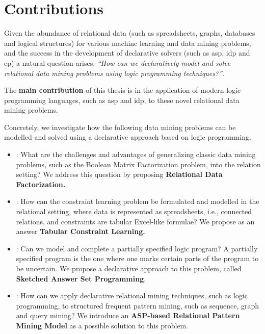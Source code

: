\section{Contributions}
Given the abundance of relational data (such as spreadsheets, graphs,
databases and logical structures) for various machine learning and data
mining problems, and the success in the development of declarative solvers (such
as \acrshort{asp}, \acrshort{idp} and \acrshort{cp}) a
natural question arises: \textit{``How can we declaratively model and
solve relational data mining problems using logic programming
techniques?''}. 

The \textbf{main contribution} of this thesis is in the application of
modern logic programming languages, such as \acrshort{asp} and
\acrshort{idp}, to these novel relational data mining problems.


Concretely, we investigate how the following data mining problems
can be modelled and solved using a declarative approach based on
logic programming.
\pubrev
\begin{itemize}
    \item \cone: What are the challenges and advantages of generalizing
    classic data mining problems, such as the Boolean Matrix
    Factorization problem, into the relation setting? We address this
        question by proposing \textbf{Relational Data Factorization.}
  \item \ctwo: How can the constraint learning problem be formulated
   and modelled in the relational setting, where data is
   represented as spreadsheets, i.e., connected relations, and constraints are
   tabular Excel-like formulae? We propose as an answer \textbf{Tabular Constraint Learning.} 
  \item \cthree: Can we model and complete a partially specified logic program?
      A partially specified program is the one where one marks certain parts of the
        program to be uncertain. We propose a declarative approach to
        this problem, called \textbf{Sketched Answer Set Programming}.
   \item \cfour:
    How can we apply declarative relational mining
    techniques, such as logic programming, to structured frequent pattern mining, such as sequence, graph
    and query mining? We introduce an \textbf{ASP-based Relational
        Pattern Mining Model} as a possible solution to this problem.
\end{itemize}
\pubrevend

